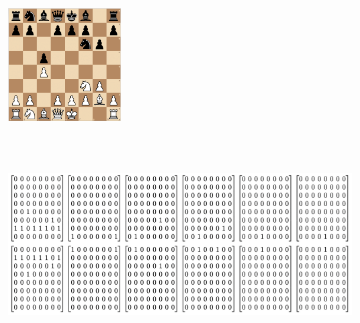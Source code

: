 \setlength\arraycolsep{2pt}
\begin{figure}[ht!]
    \begin{subfigure}[c]{0.25\textwidth}
        \centering
        \includegraphics[width=3cm]{figures/board_state.png}
    \end{subfigure}%
    ~
    \begin{subfigure}[c]{0.74\textwidth}
        \centering
        \includegraphics[width=4.5in]{figures/tensor-representation.png}

\end{subfigure}
\end{figure}
